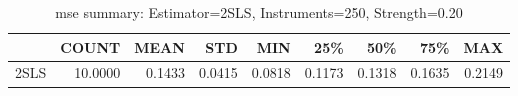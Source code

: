 \begin{table}[ht]
\centering
\caption{mse summary: Estimator=2SLS, Instruments=250, Strength=0.20}
\begin{tabular}{lrrrrrrrr}
\toprule
 & COUNT & MEAN & STD & MIN & 25\% & 50\% & 75\% & MAX \\
\midrule
2SLS & 10.0000 & 0.1433 & 0.0415 & 0.0818 & 0.1173 & 0.1318 & 0.1635 & 0.2149 \\
\bottomrule
\end{tabular}
\end{table}
